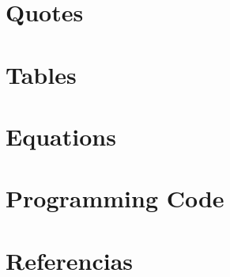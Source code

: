 \section{Quotes}

\section{Tables}

\section{Equations}

\section{Programming Code}

\section{Referencias}